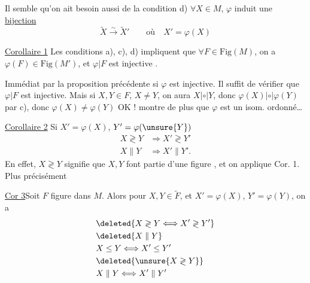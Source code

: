 Il semble qu'on ait besoin aussi de la condition
 d) $\forall X\in M$, $\varphi$ induit une \uline{bijection}
\[
\widetilde X\xrightarrow{\sim}\widetilde X'\qquad\text{où}\quad X'=\varphi(X)
\]

\uline{Corollaire 1} Les conditions a), c), d) impliquent que $\forall F\in\mathrm{Fig}(M)$, on a $\varphi(F)\in\mathrm{Fig}(M')$, et $\varphi|F$ est injective .

Immédiat par la proposition précédente  si $\varphi$ est injective.  Il suffit de vérifier que $\varphi|F$ est injective. Mais si $X,Y\in F$,  $X\ne Y$, on aura $X\mathrel{|\circ|}Y$, donc $\varphi(X)\mathrel{|\circ|}\varphi(Y)$ par c), donc $\varphi(X)\ne\varphi(Y)$ OK !   montre de plus que $\varphi$ est un isom. ordonné\ldots

\uline{Corollaire 2}\quad{} Si $X'=\varphi(X)$, $Y'=\varphi(\unsure{Y})$
\[
\begin{aligned}
X\gtrless Y&\Longrightarrow X'\gtrless Y'\\
X\parallel Y&\Longrightarrow X'\parallel Y'.
\end{aligned}
\]
En effet, $X\gtrless Y$ signifie que $X,Y$ font partie d'une figure , et on applique Cor. 1. Plus  précisément

\uline{Cor 3}\quad Soit $F$ figure dans $M$. Alors pour $X,Y\in\widetilde F$, et $X'=\varphi(X)$, $Y'=\varphi(Y)$, on a
\[
\begin{aligned}
&\deleted{X\gtrless Y\Longleftrightarrow X'\gtrless Y'}\\
&\deleted{X\parallel Y}\\
&X\leq Y\Longleftrightarrow X'\leq Y'\\
&\deleted{\unsure{X\gtrless Y}}\\
&X\parallel Y\Longleftrightarrow X'\parallel Y'
\end{aligned}
\]

